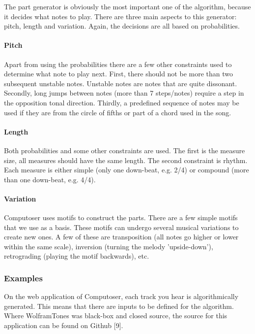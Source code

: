 \documentclass[12pt]{article}
\begin{document}
The part generator is obviously the most important one of the algorithm, because it decides what notes to play. There are three main aspects to this generator: pitch, length and variation. Again, the decisions are all based on probabilities.

\paragraph{Pitch} Apart from using the probabilities there are a few other constraints used to determine what note to play next. First, there should not be more than two subsequent unstable notes. Unstable notes are notes that are quite dissonant. Secondly, long jumps between notes (more than 7 steps/notes) require a step in the opposition tonal direction. Thirdly, a predefined sequence of notes may be used if they are from the circle of fifths or part of a chord used in the song.

\paragraph{Length} Both probabilities and some other constraints are used. The first is the measure size, all measures should have the same length. The second constraint is rhythm. Each measure is either simple (only one down-beat, e.g. 2/4) or compound (more than one down-beat, e.g. 4/4).

\paragraph{Variation} Computoser uses motifs to construct the parts. There are a few simple motifs that we use as a basis. These motifs can undergo several musical variations to create new ones. A few of these are transposition (all notes go higher or lower within the same scale), inversion (turning the melody 'upside-down'), retrograding (playing the motif backwards), etc.

\subsubsection{Examples}

On the web application of Computoser, each track you hear is algorithmically generated. This means that there are inputs to be defined for the algorithm. Where WolframTones was black-box and closed source, the source for this application can be found on Github [9].
\newline
\end{document}
